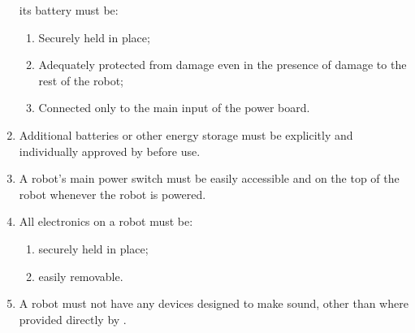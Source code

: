 \begin{enumerate}
      its battery must be:
  \begin{enumerate}
    \item Securely held in place;
    \item Adequately protected from damage even in the presence of damage to the
          rest of the robot;
    \item Connected only to the main input of the power board.
  \end{enumerate}
\item Additional batteries or other energy storage must be explicitly and
     individually approved by \org before use.
\item A robot's main power switch must be easily accessible and on the top of
      the robot whenever the robot is powered.
\item All electronics on a robot must be:
  \begin{enumerate}
    \item securely held in place;
    \item easily removable.
  \end{enumerate}
\item A robot must not have any devices designed to make sound, other than
      where provided directly by \org{}.
\end{enumerate}
